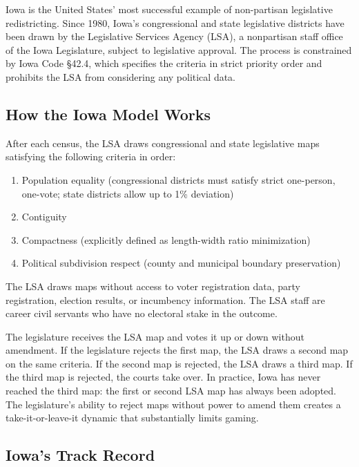 Iowa is the United States' most successful example of non-partisan legislative redistricting. Since 1980, Iowa's congressional and state legislative districts have been drawn by the Legislative Services Agency (LSA), a nonpartisan staff office of the Iowa Legislature, subject to legislative approval. The process is constrained by Iowa Code \S42.4, which specifies the criteria in strict priority order and prohibits the LSA from considering any political data.

\subsection{How the Iowa Model Works}

After each census, the LSA draws congressional and state legislative maps satisfying the following criteria in order:

\begin{enumerate}
  \item Population equality (congressional districts must satisfy strict one-person, one-vote; state districts allow up to 1\% deviation)
  \item Contiguity
  \item Compactness (explicitly defined as length-width ratio minimization)
  \item Political subdivision respect (county and municipal boundary preservation)
\end{enumerate}

The LSA draws maps without access to voter registration data, party registration, election results, or incumbency information. The LSA staff are career civil servants who have no electoral stake in the outcome.

The legislature receives the LSA map and votes it up or down without amendment. If the legislature rejects the first map, the LSA draws a second map on the same criteria. If the second map is rejected, the LSA draws a third map. If the third map is rejected, the courts take over. In practice, Iowa has never reached the third map: the first or second LSA map has always been adopted. The legislature's ability to reject maps without power to amend them creates a take-it-or-leave-it dynamic that substantially limits gaming.

\subsection{Iowa's Track Record}

